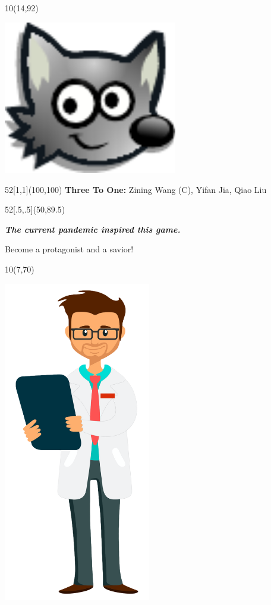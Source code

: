 \documentclass[hyperref={pdfpagelabels=false}]{beamer}
\begin{document}
\begin{frame}
	\begin{textblock}{10}(14,92)
		\begin{blankbox}
			\centering
			\includegraphics[height=190pt]{img/SF-head.pdf}
		\end{blankbox}
	\end{textblock}

	\begin{textblock}{52}[1,1](100,100)
			\huge\textbf{{Three To One:}} Zining Wang (C), Yifan Jia, Qiao Liu
	\end{textblock}

	\begin{textblock}{52}[.5,.5](50,89.5)

		\centering\em\bf\Huge
			The current pandemic inspired this game. 

			Become a protagonist and a savior!

	\end{textblock}


	\begin{textblock}{10}(7,70)
		\begin{blankbox}
			\centering
			\includegraphics[height=400pt]{img/ai97b-ej97b.png}
		\end{blankbox}
	\end{textblock}


\end{frame}
\end{document}
